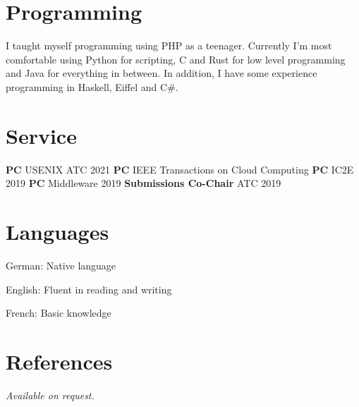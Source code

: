 \documentclass[margin,line]{cv}
\begin{document}
\begin{resume}
    \section{\mysidestyle Programming}

    I taught myself programming using PHP as a teenager. Currently I'm most
    comfortable using Python for scripting, C and Rust for low level programming and
    Java for everything in between. In addition, I have some experience programming
    in Haskell, Eiffel and C\#.

    \section{\mysidestyle Service}
    \textbf{PC} USENIX ATC 2021 %
    \textbf{PC} IEEE Transactions on Cloud Computing %
    \textbf{PC} IC2E 2019 %
    \textbf{PC} Middleware 2019 %
    \textbf{Submissions Co-Chair} ATC 2019 %


    \section{\mysidestyle Languages}
    \begin{list2}
        \item German: Native language
        \item English: Fluent in reading and writing
        \item French: Basic knowledge
    \end{list2}\vspace{-1.5mm}

    \pagebreak

    \section{\mysidestyle References}
     {\sl Available on request.}


\end{resume}
\end{document}
